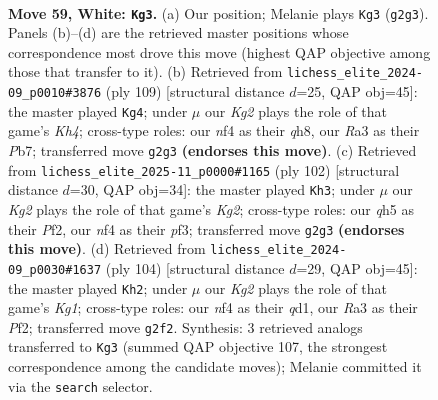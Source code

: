 \documentclass[11pt]{article}
\begin{document}
\clearpage

\begin{figure}[p]\centering
\begin{subfigure}{0.46\textwidth}\centering
\resizebox{\linewidth}{!}{%
\newchessgame
\chessboard[
  setfen={8/p5k1/1p6/7q/P1p2n2/RP6/6K1/8 w - - 0 59},
  showmover=false,
  pgfstyle=straightmove, color=movearrow, markmove={g2-g3}
]}
\caption{}
\end{subfigure}\hfill
\begin{subfigure}{0.46\textwidth}\centering
\resizebox{\linewidth}{!}{%
\newchessgame
\chessboard[
  setfen={7Q/1p6/4P1p1/7k/1r3P1P/4K3/p7/8 b - - 4 55},
  showmover=false,
  pgfstyle=straightmove, color=movearrow, markmove={h5-g4}
]}
\caption{}
\end{subfigure}
\\[4pt]
\begin{subfigure}{0.46\textwidth}\centering
\resizebox{\linewidth}{!}{%
\newchessgame
\chessboard[
  setfen={2r5/8/4p3/PRp5/4k3/1P3p2/5PK1/8 w - - 0 52},
  showmover=false,
  pgfstyle=straightmove, color=movearrow, markmove={g2-h3}
]}
\caption{}
\end{subfigure}\hfill
\begin{subfigure}{0.46\textwidth}\centering
\resizebox{\linewidth}{!}{%
\newchessgame
\chessboard[
  setfen={8/pp6/8/8/1P3k2/P5Rp/5P2/3q2K1 w - - 4 53},
  showmover=false,
  pgfstyle=straightmove, color=movearrow, markmove={g1-h2}
]}
\caption{}
\end{subfigure}
\caption{\textbf{Move 59, White: \texttt{Kg3}.} (a) Our position; Melanie plays \texttt{Kg3} (\texttt{g2g3}). Panels (b)--(d) are the retrieved master positions whose correspondence most drove this move (highest QAP objective among those that transfer to it). (b) Retrieved from \texttt{lichess\_elite\_2024-09\_p0010\#3876} (ply 109) [structural distance $d$=25, QAP obj=45]: the master played \texttt{Kg4}; under $\mu$ our \emph{Kg2} plays the role of that game's \emph{Kh4}; cross-type roles: our \emph{n}f4 as their \emph{q}h8, our \emph{R}a3 as their \emph{P}b7; transferred move \texttt{g2g3} \textbf{(endorses this move)}. (c) Retrieved from \texttt{lichess\_elite\_2025-11\_p0000\#1165} (ply 102) [structural distance $d$=30, QAP obj=34]: the master played \texttt{Kh3}; under $\mu$ our \emph{Kg2} plays the role of that game's \emph{Kg2}; cross-type roles: our \emph{q}h5 as their \emph{P}f2, our \emph{n}f4 as their \emph{p}f3; transferred move \texttt{g2g3} \textbf{(endorses this move)}. (d) Retrieved from \texttt{lichess\_elite\_2024-09\_p0030\#1637} (ply 104) [structural distance $d$=29, QAP obj=45]: the master played \texttt{Kh2}; under $\mu$ our \emph{Kg2} plays the role of that game's \emph{Kg1}; cross-type roles: our \emph{n}f4 as their \emph{q}d1, our \emph{R}a3 as their \emph{P}f2; transferred move \texttt{g2f2}. Synthesis: 3 retrieved analogs transferred to \texttt{Kg3} (summed QAP objective 107, the strongest correspondence among the candidate moves); Melanie committed it via the \texttt{search} selector.}
\label{fig:thought-m116}
\end{figure}
\end{document}
